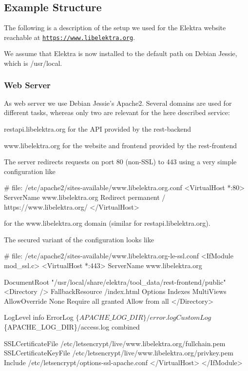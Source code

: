 \subsection*{Example Structure}

The following is a description of the setup we used for the Elektra website reachable at \href{https://www.libelektra.org}{\tt https\+://www.\+libelektra.\+org}.

We assume that Elektra is now installed to the default path on Debian Jessie, which is {\ttfamily /usr/local}.

\subsubsection*{Web Server}

As web server we use Debian Jessie’s Apache2. Several domains are used for different tasks, whereas only two are relevant for the here described service\+:


\begin{DoxyItemize}
\item {\ttfamily restapi.\+libelektra.\+org} for the A\+PI provided by the {\ttfamily rest-\/backend}
\item {\ttfamily www.\+libelektra.\+org} for the website and frontend provided by the {\ttfamily rest-\/frontend}
\end{DoxyItemize}

The server redirects requests on port 80 (non-\/\+S\+SL) to 443 using a very simple configuration like


\begin{DoxyCode}
# file: /etc/apache2/sites-available/www.libelektra.org.conf
<VirtualHost *:80>
    ServerName www.libelektra.org
    Redirect permanent / https://www.libelektra.org/
</VirtualHost>
\end{DoxyCode}


for the {\ttfamily www.\+libelektra.\+org} domain (similar for {\ttfamily restapi.\+libelektra.\+org}).

The secured variant of the configuration looks like


\begin{DoxyCode}
# file: /etc/apache2/sites-available/www.libelektra.org-le-ssl.conf
<IfModule mod\_ssl.c>
<VirtualHost *:443>
    ServerName www.libelektra.org

    DocumentRoot "/usr/local/share/elektra/tool\_data/rest-frontend/public"
    <Directory />
        FallbackResource /index.html
        Options Indexes MultiViews
        AllowOverride None
        Require all granted
        Allow from all
    </Directory>

    LogLevel info
        ErrorLog $\{APACHE\_LOG\_DIR\}/error.log
        CustomLog $\{APACHE\_LOG\_DIR\}/access.log combined

    SSLCertificateFile /etc/letsencrypt/live/www.libelektra.org/fullchain.pem
    SSLCertificateKeyFile /etc/letsencrypt/live/www.libelektra.org/privkey.pem
    Include /etc/letsencrypt/options-ssl-apache.conf
</VirtualHost>
</IfModule>
\end{DoxyCode}


